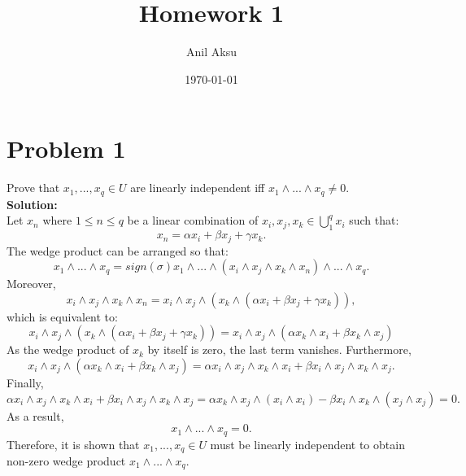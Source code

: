 \documentclass[11pt]{amsart}
\title{Homework 1}
\author{Anil Aksu}
\date{\today}
\begin{document}
\maketitle

\section{Problem 1 }

Prove that $x_1,...,x_q\in U$ are linearly independent iff $x_1\wedge ...\wedge x_q \neq 0$.
\\

\textbf{Solution:}\\
Let $x_n$ where $1\leq n \leq q$ be a linear combination of $x_i,x_j,x_k \in \bigcup_{1}^{q}x_i$ such that:
\begin{equation}
x_n=\alpha x_i +\beta x_j +\gamma x_k.
\end{equation}
The wedge product can be arranged so that:
\begin{equation}
x_1\wedge ...\wedge x_q=sign(\sigma)x_1\wedge...\wedge(x_i\wedge x_j \wedge x_k \wedge x_n)\wedge ... \wedge x_q.
\end{equation}
Moreover,
\begin{equation}
x_i\wedge x_j \wedge x_k \wedge x_n=x_i\wedge x_j \wedge( x_k \wedge (\alpha x_i +\beta x_j +\gamma x_k)),
\end{equation}
which is equivalent to:
\begin{equation}
x_i\wedge x_j \wedge( x_k \wedge (\alpha x_i +\beta x_j +\gamma x_k))=x_i\wedge x_j \wedge(\alpha x_k \wedge  x_i +\beta x_k \wedge x_j)
\end{equation}
As the wedge product of $x_k$ by itself is zero, the last term vanishes. Furthermore,
\begin{equation}
x_i\wedge x_j \wedge(\alpha x_k \wedge  x_i +\beta x_k \wedge x_j)=\alpha x_i\wedge x_j \wedge x_k \wedge  x_i+\beta x_i\wedge x_j \wedge x_k \wedge x_j.
\end{equation}
Finally,
\begin{equation}
\alpha x_i\wedge x_j \wedge x_k \wedge  x_i+\beta x_i\wedge x_j \wedge x_k \wedge x_j=\alpha x_k\wedge x_j \wedge( x_i \wedge  x_i)-\beta x_i\wedge x_k \wedge( x_j \wedge x_j)=0.
\end{equation}
As a result,
\begin{equation}
x_1\wedge ...\wedge x_q=0.
\end{equation}
Therefore, it is shown that  $x_1,...,x_q\in U$ must be linearly independent to obtain non-zero wedge product $x_1\wedge ...\wedge x_q$.
\end{document}
